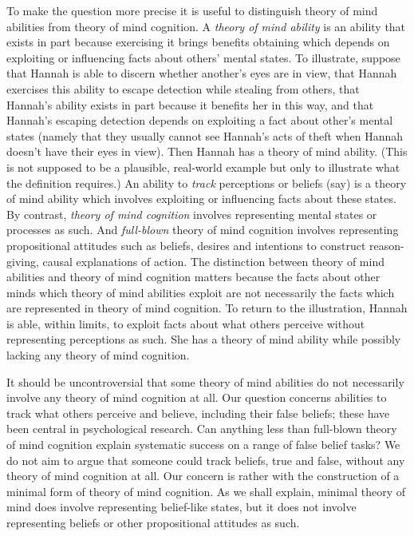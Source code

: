 \documentclass[12pt,\papersize]{extarticle}
\begin{document}
To make the question more precise it is useful to distinguish 
theory of mind abilities from theory of mind cognition.  
A  \textit{theory of mind ability} is an ability that exists in part because exercising it brings benefits obtaining which depends on exploiting or influencing facts about others’ mental states.
To illustrate,
suppose that Hannah is able to discern whether another's eyes are in view,
that Hannah exercises this ability to escape detection while stealing from others,
that Hannah's ability exists in part because it benefits her in this way,
and 
that Hannah's escaping detection depends on exploiting a fact about other's mental states (namely that they usually cannot  see Hannah's acts of theft when Hannah doesn't have their eyes in view).
Then Hannah has a theory of mind ability.
(This is not supposed to be a plausible, real-world example but only to illustrate what the definition requires.)
An ability to \textit{track} perceptions or beliefs (say) is a theory of mind ability which involves exploiting or influencing facts about these states.
By contrast, \textit{theory of mind cognition} involves representing mental states or processes as such.
And \textit{full-blown} theory of mind cognition involves  representing propositional attitudes such as beliefs, desires and intentions to construct reason-giving, causal explanations of action.  
The distinction between theory of mind abilities and theory of mind cognition matters because the facts about other minds which theory of mind abilities exploit are not necessarily the facts which are represented in theory of mind cognition.  
To return to the illustration, Hannah is able, within limits, to exploit facts about what others perceive without representing perceptions as such. 
She has a theory of mind ability while possibly lacking any theory of mind cognition.

It should be uncontroversial that some theory of mind abilities do not necessarily involve any theory of mind cognition at all. 
Our question concerns abilities to track what others perceive and believe, including their false beliefs; these have been central in psychological research.
Can anything less than full-blown theory of mind cognition  explain systematic success on a range of false belief tasks?
We do not aim to argue that someone could track beliefs, true and false, without any theory of mind cognition at all.
Our concern is rather with the construction of a minimal form of theory of mind cognition.
As we shall explain, minimal theory of mind does involve representing  belief-like  states, but it does not involve representing beliefs or other propositional attitudes as such.
\end{document}
